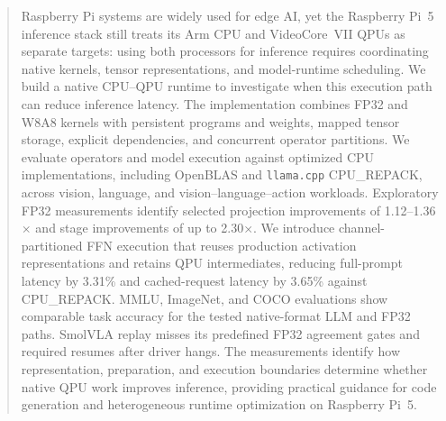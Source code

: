 \documentclass[sigplan,screen,review]{acmart}
\begin{document}
\author{Dimitrios Stamoulis}

\author{Jie Liu}

\renewcommand{\shortauthors}{Hadjiyianni et al.}


\begin{abstract}
Raspberry Pi systems are widely used for edge AI, yet the Raspberry Pi~5 inference stack still treats its Arm CPU and VideoCore~VII QPUs as separate targets: using both processors for inference requires coordinating native kernels, tensor representations, and model-runtime scheduling. We build a native CPU--QPU runtime to investigate when this execution path can reduce inference latency. The implementation combines FP32 and W8A8 kernels with persistent programs and weights, mapped tensor storage, explicit dependencies, and concurrent operator partitions. We evaluate operators and model execution against optimized CPU implementations, including OpenBLAS and \texttt{llama.cpp} CPU\_REPACK, across vision, language, and vision--language--action workloads. Exploratory FP32 measurements identify selected projection improvements of 1.12--1.36$\times$ and stage improvements of up to 2.30$\times$. We introduce channel-partitioned FFN execution that reuses production activation representations and retains QPU intermediates, reducing full-prompt latency by 3.31\% and cached-request latency by 3.65\% against CPU\_REPACK. MMLU, ImageNet, and COCO evaluations show comparable task accuracy for the tested native-format LLM and FP32 paths. SmolVLA replay misses its predefined FP32 agreement gates and required resumes after driver hangs. The measurements identify how representation, preparation, and execution boundaries determine whether native QPU work improves inference, providing practical guidance for code generation and heterogeneous runtime optimization on Raspberry Pi~5.
\end{abstract}
\end{document}
